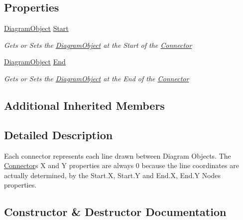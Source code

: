 \subsection*{Properties}
\begin{DoxyCompactItemize}
\item 
\hyperlink{class_prototipo_t_f_g_1_1_diagram_object}{Diagram\+Object} \hyperlink{class_prototipo_t_f_g_1_1_connector_a9997eb5d88db2bbf9eda6e92c89118b8}{Start}
\begin{DoxyCompactList}\small\item\em Gets or Sets the \hyperlink{class_prototipo_t_f_g_1_1_diagram_object}{Diagram\+Object} at the Start of the \hyperlink{class_prototipo_t_f_g_1_1_connector}{Connector} \end{DoxyCompactList}\item 
\hyperlink{class_prototipo_t_f_g_1_1_diagram_object}{Diagram\+Object} \hyperlink{class_prototipo_t_f_g_1_1_connector_a58642b5031c0d26ff5030c573342745e}{End}
\begin{DoxyCompactList}\small\item\em Gets or Sets the \hyperlink{class_prototipo_t_f_g_1_1_diagram_object}{Diagram\+Object} at the End of the \hyperlink{class_prototipo_t_f_g_1_1_connector}{Connector} \end{DoxyCompactList}\end{DoxyCompactItemize}
\subsection*{Additional Inherited Members}


\subsection{Detailed Description}
Each connector represents each line drawn between Diagram Objects. The \hyperlink{class_prototipo_t_f_g_1_1_connector}{Connector}\textquotesingle{}s X and Y properties are always 0 because the line coordinates are actually determined, by the Start.\+X, Start.\+Y and End.\+X, End.\+Y Nodes\textquotesingle{} properties. 



\subsection{Constructor \& Destructor Documentation}
\hypertarget{class_prototipo_t_f_g_1_1_connector_a51b8f8f54d3cf94eff3edd27013d155c}{}
